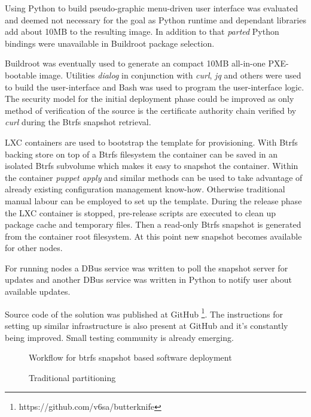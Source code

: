 \documentclass{article}
\begin{document}
Using Python to build pseudo-graphic menu-driven user interface was
evaluated and deemed not necessary for the goal as Python runtime and
dependant libraries add about 10MB to the resulting image.
In addition to that \emph{parted} Python bindings were unavailable
in Buildroot package selection.

Buildroot was eventually used to generate an compact 10MB all-in-one
PXE-bootable image. Utilities \emph{dialog} in conjunction with
\emph{curl}, \emph{jq} and others were used to build the user-interface
and Bash was used to program the user-interface logic.
The security model for the initial deployment phase could be improved
as only method of verification of the source is the certificate
authority chain verified by \emph{curl} during the Btrfs snapshot
retrieval.

LXC containers are used to bootstrap the template for provisioning.
With Btrfs backing store on top of a Btrfs filesystem the container
can be saved in an isolated Btrfs subvolume which makes it easy to
snapshot the container.
Within the container \emph{puppet apply} and similar methods can be used
to take advantage of already existing configuration management know-how.
Otherwise traditional manual labour can be employed to set up the template.
During the release phase the LXC container is stopped, pre-release scripts
are executed to clean up package cache and temporary files.
Then a read-only Btrfs snapshot is generated from the container root filesystem.
At this point new snapshot becomes available for other nodes.

For running nodes a DBus service was written to poll the snapshot server
for updates and another DBus service was written in Python to notify user
about available updates.

Source code of the solution was published at GitHub
\footnote{https://github.com/v6sa/butterknife}.
The instructions for setting up similar infrastructure
is also present at GitHub and it's constantly being improved.
Small testing community is already emerging.

\begin{figure}[!htb]
\centering
\scalebox{0.5}{}
\caption{Workflow for btrfs snapshot based software deployment}
\label{fig:digraph}
\end{figure}

\begin{figure}[!htb]
\centering
\scalebox{0.5}{}
\caption{Traditional partitioning}
\label{fig:digraph}
\end{figure}
\end{document}
